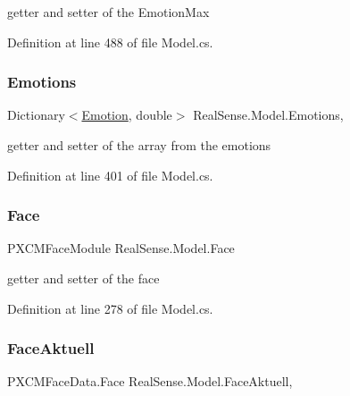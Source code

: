 getter and setter of the Emotion\+Max 

Definition at line 488 of file Model.\+cs.

\mbox{\label{class_real_sense_1_1_model_a30358a7ea8e1e59815e2f562a3fc6bad}} 
\subsubsection{\texorpdfstring{Emotions}{Emotions}}
{\footnotesize\ttfamily Dictionary$<$\hyperlink{class_real_sense_1_1_model_a5bf3fde8f53519f7a740d8b4e0399208}{Emotion}, double$>$ Real\+Sense.\+Model.\+Emotions\hspace{0.3cm}{\ttfamily [get]}, {\ttfamily [set]}}

getter and setter of the array from the emotions 

Definition at line 401 of file Model.\+cs.

\mbox{\label{class_real_sense_1_1_model_abb8701f1030ca1e3bfd226a9ad352da5}} 
\subsubsection{\texorpdfstring{Face}{Face}}
{\footnotesize\ttfamily P\+X\+C\+M\+Face\+Module Real\+Sense.\+Model.\+Face\hspace{0.3cm}{\ttfamily [get]}}

getter and setter of the face 

Definition at line 278 of file Model.\+cs.

\mbox{\label{class_real_sense_1_1_model_a3621c14d22c3709775971fed725c2781}} 
\subsubsection{\texorpdfstring{Face\+Aktuell}{FaceAktuell}}
{\footnotesize\ttfamily P\+X\+C\+M\+Face\+Data.\+Face Real\+Sense.\+Model.\+Face\+Aktuell\hspace{0.3cm}{\ttfamily [get]}, {\ttfamily [set]}}

